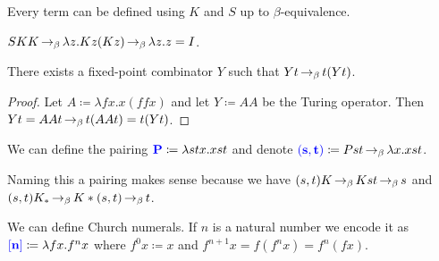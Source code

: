 \begin{rem}
    Every term can be defined using $K$ and $S$ up to $\beta$-equivalence.
\end{rem}

\begin{example}
    $SKK \operatorname{\to_{\beta}} \lambda z. Kz(Kz) \operatorname{\to_{\beta}} \lambda z.z = I$.
\end{example}

\begin{boxprop} \label{prop:fixpoi}
    There exists a \alert{fixed-point combinator} $Y$ such that $Y t \operatorname{\to_{\beta}} t(Yt)$.
\end{boxprop}
\begin{proof}
    Let $A \coloneq \lambda fx. x(ffx)$ and let $Y \coloneq AA$ be the \alert{Turing operator}.
    Then $Yt = AAt \operatorname{\to_{\beta}} t (AAt) = t(Yt)$.
\end{proof}

\begin{boxdefi}
    We can define the \alert{pairing} $\alert{P} \coloneq \lambda stx.xst$ and denote $\alert{(s, t)} \coloneq Pst \bered \lambda x. xst$.
\end{boxdefi}

\begin{rem}
    Naming this a pairing makes sense because we have $(s, t) K \operatorname{\to_{\beta}} Kst \operatorname{\to_{\beta}} s$ and $(s, t) K_* \operatorname{\to_{\beta}} K*(s, t) \operatorname{\to_{\beta}} t$.
\end{rem}

\begin{boxdefi}
    We can define \alert{Church numerals}. 
    If $n$ is a natural number we encode it as $\alert{[n]} \coloneq \lambda fx. f^n x$ where $f^0 x \coloneq x$ and $f^{n+1} x = f(f^nx) = f^n(fx)$.
\end{boxdefi}

